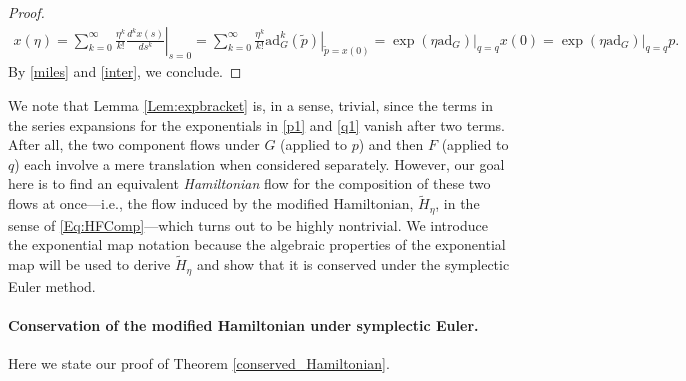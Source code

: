\documentclass[11pt]{article}
\newcommand{\ad}{\mathrm{ad}}
\begin{document}
\begin{proof}
    \begin{gather}
        x\left(\eta\right)=\sum_{k=0}^{\infty}{\frac{\eta^{k}}{k!}\left.\frac{d^{k}x\left(s\right)}{ds^{k}}\right|_{s=0}}=\sum_{k=0}^{\infty}{\frac{\eta^{k}}{k!}\left.\ad_{G}^{k}\left(\widetilde{p}\right)\right|_{\widetilde{p}=x\left(0\right)}}=\left.\exp\left(\eta \ad_{G}\right)\right|_{q=q}x(0)=\left.\exp\left(\eta \ad_{G}\right)\right|_{q=q}p.\label{inter}
    \end{gather}
    By \eqref{miles} and \eqref{inter}, we conclude.
\end{proof}

 We note that Lemma \ref{Lem:expbracket} is, in a sense, trivial, since the terms in the series expansions for the exponentials in \eqref{p1} and \eqref{q1} vanish after two terms. After all, the two component flows under $G$ (applied to $p$) and then $F$ (applied to $q$) each involve a mere translation when considered separately. However, our goal here is to find an equivalent \textit{Hamiltonian} flow for the composition of these two flows at once---i.e., the flow induced by the modified Hamiltonian, $\widetilde{H}_{\eta}$, in the sense of \eqref{Eq:HFComp}---which turns out to be highly nontrivial. We introduce the exponential map notation because the algebraic properties of the exponential map will be used to derive $\widetilde{H}_{\eta}$ and show that it is conserved under the symplectic Euler method. 

\paragraph{Conservation of the modified Hamiltonian under symplectic Euler.} Here we state our proof of Theorem \ref{conserved_Hamiltonian}.
\end{document}
